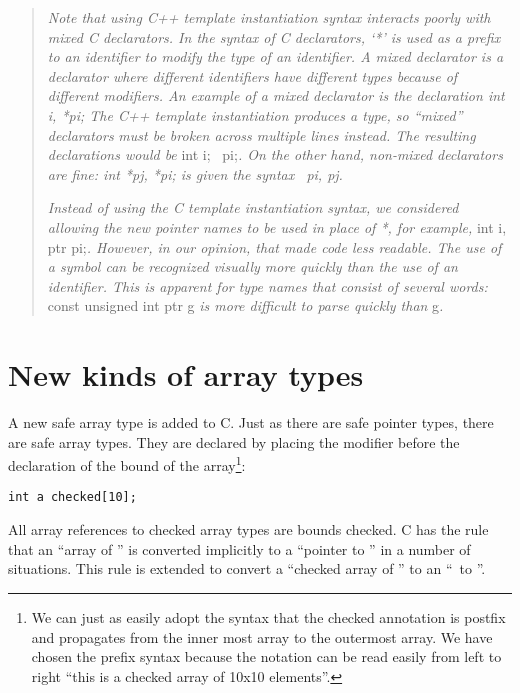 \begin{quote}
\emph{Note that using C++ template instantiation syntax interacts poorly
with mixed C declarators. In the syntax of C declarators, `*' is used as
a prefix to an identifier to modify the type of an identifier. A mixed
declarator is a declarator where different identifiers have different
types because of different modifiers. An example of a mixed declarator
is the declaration int i, *pi; The C++ template instantiation produces a
type, so ``mixed'' declarators} \emph{must be broken across multiple
lines instead. The resulting declarations would be} int i;
\ptrint\ pi;\emph{. On the other hand, non-mixed
declarators are fine: int *pj, *pi; is given the syntax
\ptrint\ pi, pj.}

\emph{Instead of using the C template instantiation syntax, we
considered allowing the new pointer names to be used in place of *, for
example,} int i, ptr pi;\emph{. However, in our opinion, that made code
less readable. The use of a symbol can be recognized visually more
quickly than the use of an identifier. This is apparent for type names
that consist of several words:} const unsigned int ptr g \emph{is more
difficult to parse quickly than}  g\emph{.}
\end{quote}

\section{New kinds of array types}

A new safe array type is added to C. Just as there are safe pointer
types, there are safe array types. They are declared by placing the
modifier  before the declaration of the bound of the
array\footnote{We can just as easily adopt the syntax that the checked
annotation is postfix and propagates from the inner most array to the
 outermost array. We have chosen the prefix syntax because the notation
 can be read easily from left to right ``this is a checked array of
 10x10 elements''.}:
\begin{verbatim}
int a checked[10];
\end{verbatim}

All array references to checked array types are bounds checked. C has
the rule that an ``array of '' is converted implicitly to a
``pointer to '' in a number of situations. This rule is extended
to convert a ``checked array of '' to an ``\arrayptr\ 
to ''.

